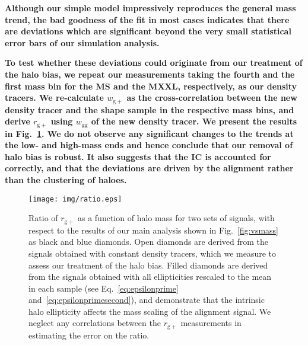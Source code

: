 \documentclass[a4paper,fleqn,usenatbib]{mnras}
\newenvironment{correction}
 {\bfseries}%
  {}%
\begin{document}
\begin{correction}
Although our simple model impressively reproduces the general mass trend, the bad goodness of the fit in most cases indicates that there are deviations which are significant beyond the very small statistical error bars of our simulation analysis.
\end{correction}

\begin{correction}
To test whether these deviations could originate from our treatment of the halo bias, we repeat our measurements taking the fourth and the first mass bin for the MS and the MXXL, respectively, as our density tracers. We re-calculate $w_\mathrm{g+}$ as the cross-correlation between the new density tracer and the shape sample in the respective mass bins, and derive $r_\mathrm{g+}$ using $w_\mathrm{gg}$ of the new density tracer. We present the results in Fig.~\ref{fig:ratio}. We do not observe any significant changes to the trends at the low- and high-mass ends and hence conclude that our removal of halo bias is robust. It also suggests that the IC is accounted for correctly, and that the deviations are driven by the alignment rather than the clustering of haloes.

\begin{figure}
	\centerline{
	\texttt{[image: img/ratio.eps]}}
	\caption{Ratio of $r_{\mathrm{g+}}$ as a function of halo mass for two sets of signals, with respect to the results of our main analysis shown in Fig.~\ref{fig:vsmass} as black and blue diamonds. Open diamonds are derived from the signals obtained with constant density tracers, which we measure to assess our treatment of the halo bias. Filled diamonds are derived from the signals obtained with all ellipticities rescaled to the mean in each sample (see Eq.~\ref{eq:epsilonprime} and~\ref{eq:epsilonprimesecond}), and demonstrate that the intrinsic halo ellipticity affects the mass scaling of the alignment signal. We neglect any correlations between the $r_\mathrm{g+}$ measurements in estimating the error on the ratio.}
	\label{fig:ratio}
\end{figure}

\end{correction}
\end{document}
